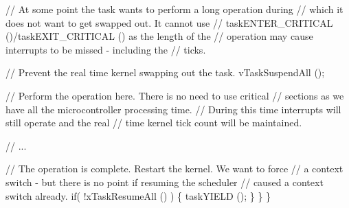 \begin{DoxyPre}     // At some point the task wants to perform a long operation during
     // which it does not want to get swapped out.  It cannot use
     // taskENTER\_CRITICAL ()/taskEXIT\_CRITICAL () as the length of the
     // operation may cause interrupts to be missed - including the
     // ticks.\end{DoxyPre}



\begin{DoxyPre}     // Prevent the real time kernel swapping out the task.
     vTaskSuspendAll ();\end{DoxyPre}



\begin{DoxyPre}     // Perform the operation here.  There is no need to use critical
     // sections as we have all the microcontroller processing time.
     // During this time interrupts will still operate and the real
     // time kernel tick count will be maintained.\end{DoxyPre}



\begin{DoxyPre}     // ...\end{DoxyPre}



\begin{DoxyPre}     // The operation is complete.  Restart the kernel.  We want to force
     // a context switch - but there is no point if resuming the scheduler
     // caused a context switch already.
     if( !xTaskResumeAll () )
     \{
          taskYIELD ();
     \}
    \}
\}
  \end{DoxyPre}
 
